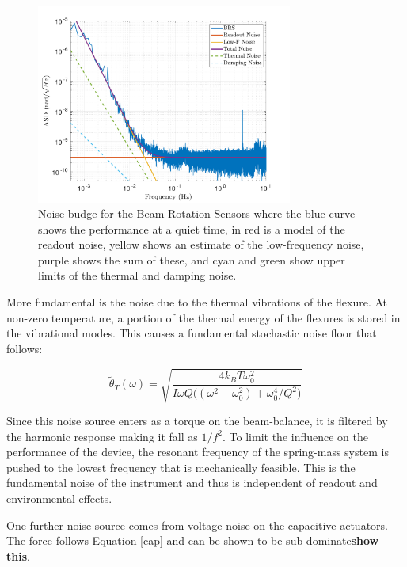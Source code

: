 \documentclass [12pt, proquest]{uwthesis}[2019]
\begin{document}
\begin{figure}[!h]
\begin{center}
\includegraphics[width=0.75\textwidth]{BRSNoiseModel.pdf}
\caption[Noise budge for the Beam Rotation Sensors]{Noise budge for the Beam Rotation Sensors where the blue curve shows the performance at a quiet time, in red is a model of the readout noise, yellow shows an estimate of the low-frequency noise, purple shows the sum of these, and cyan and green show upper limits of the thermal and damping noise.}
\label{noise}
\end{center}
\end{figure}

More fundamental is the noise due to the thermal vibrations of the flexure. At non-zero temperature, a portion of the thermal energy of the flexures is stored in the vibrational modes. This causes a fundamental stochastic noise floor that follows\cite{thermal}:

\begin{equation}
\tilde\theta_T(\omega)=\sqrt{\frac{4 k_B T \omega_0^2}{I \omega Q\big((\omega^2-\omega_0^2)+\omega_0^4/Q^2\big)}}
\end{equation}

Since this noise source enters as a torque on the beam-balance, it is filtered by the harmonic response making it fall as $1/f^2$. To limit the influence on the performance of the device, the resonant frequency of the spring-mass system is pushed to the lowest frequency that is mechanically feasible. This is the fundamental noise of the instrument and thus is independent of readout and environmental effects.

 One further noise source comes from voltage noise on the capacitive actuators. The force follows Equation \ref{cap} and can be shown to be sub dominate\textbf{show this}.
\end{document}

